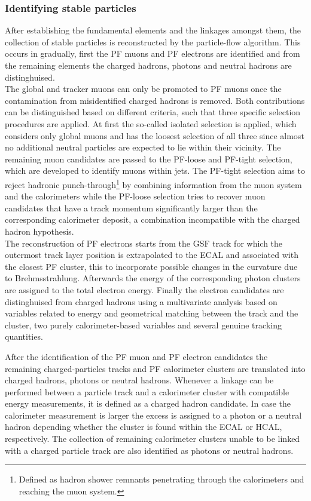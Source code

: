 \subsubsection*{Identifying stable particles}
After establishing the fundamental elements and the linkages amongst them, the collection of stable particles is reconstructed by the particle-flow algorithm. This occurs in gradually, first the PF muons and PF electrons are identified and from the remaining elements the charged hadrons, photons and neutral hadrons are distinghuised.
\\
The global and tracker muons can only be promoted to PF muons once the contamination from misidentified charged hadrons is removed.
Both contributions can be distinguished based on different criteria, such that three specific selection procedures are applied.
At first the so-called isolated selection is applied, which considers only global muons and has the loosest selection of all three since almost no additional neutral particles are expected to lie within their vicinity. 
The remaining muon candidates are passed to the PF-loose and PF-tight selection, which are developed to identify muons within jets. The PF-tight selection aims to reject hadronic punch-through\footnote{Defined as hadron shower remnants penetrating through the calorimeters and reaching the muon system.} by combining information from the muon system and the calorimeters while the PF-loose selection tries to recover muon candidates that have a track momentum significantly larger than the corresponding calorimeter deposit, a combination incompatible with the charged hadron hypothesis.
\\
The reconstruction of PF electrons starts from the GSF track for which the outermost track layer position is extrapolated to the ECAL and associated with the closest PF cluster, this to incorporate possible changes in the curvature due to Brehmsstrahlung.
Afterwards the energy of the corresponding photon clusters are assigned to the total electron energy. Finally the electron candidates are distinghuised from charged hadrons using a multivariate analysis based on variables related to energy and geometrical matching between the track and the cluster, two purely calorimeter-based variables and several genuine tracking quantities.

After the identification of the PF muon and PF electron candidates the remaining charged-particles tracks and PF calorimeter clusters are translated into charged hadrons, photons or neutral hadrons.
Whenever a linkage can be performed between a particle track and a calorimeter cluster with compatible energy measurements, it is defined as a charged hadron candidate. In case the calorimeter measurement is larger the excess is assigned to a photon or a neutral hadron depending whether the cluster is found within the ECAL or HCAL, respectively.
The collection of remaining calorimeter clusters unable to be linked with a charged particle track are also identified as photons or neutral hadrons.

